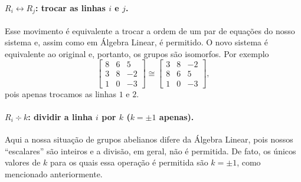     	\paragraph{$R_i\leftrightarrow R_j$: trocar as linhas $i$ e $j$.} Esse movimento é equivalente a 
    	trocar a ordem de um par de equações do nosso sistema e, assim como em Álgebra Linear, 
    	é permitido. O novo 
    	sistema é equivalente ao original e, portanto, os grupos são isomorfos. Por exemplo
    	\[
    	\begin{bmatrix}
    	8 & 6 & 5 \\
    	3 & 8 & -2 \\
    	1 & 0 & -3
    	\end{bmatrix}\cong\begin{bmatrix}
    	3 & 8 & -2 \\
    	8 & 6 & 5 \\
    	1 & 0 & -3
    	\end{bmatrix},
    	\]
    	pois apenas trocamos as linhas $1$ e $2$.
    	
    	\paragraph{$R_i \div k$: dividir a linha $i$ por $k$ ($k=\pm1$ apenas).} Aqui a nossa situação 
    	de grupos abelianos difere da Álgebra Linear, pois nossos ``escalares'' são inteiros e a divisão, 
    	em geral, não é permitida. De fato, os únicos valores de $k$ para os quais essa operação é permitida 
    	são $k=\pm1$, como mencionado anteriormente.
    	
